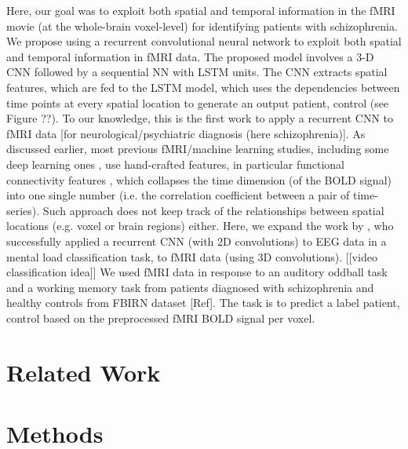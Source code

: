 \documentclass{article} %
\begin{document}
Here, our goal was to exploit both spatial and temporal information in the fMRI movie (at the whole-brain voxel-level) for identifying patients with schizophrenia. We propose using a recurrent convolutional neural network to exploit both spatial and temporal information in fMRI data. The proposed model involves a 3-D CNN followed by a sequential NN with LSTM units. The CNN extracts spatial features, which are fed to the LSTM model, which uses the dependencies between time points at every spatial location to generate an output {patient, control} (see Figure ??). To our knowledge, this is the first work to apply a recurrent CNN to fMRI data [for neurological/psychiatric diagnosis (here schizophrenia)]. As discussed earlier, most previous fMRI/machine learning studies, including some deep learning ones \citep{Kim2016}, use hand-crafted features, in particular functional connectivity features \citep{Gheiratmand2017}, which collapses the time dimension (of the BOLD signal) into one single number (i.e. the correlation coefficient between a pair of time-series). Such approach does not keep track of the relationships between spatial locations (e.g. voxel or brain regions) either. Here, we expand the work by \citet{Bashivan2015}, who successfully applied a recurrent CNN (with 2D convolutions) to EEG data in a mental load classification task, to fMRI data (using 3D convolutions). [[video classification idea]] We used fMRI data in response to an auditory oddball task and a working memory task from patients diagnosed with schizophrenia and healthy controls from FBIRN dataset [Ref]. The task is to predict a label {patient, control} based on the preprocessed fMRI BOLD signal per voxel. 

   


\section{Related Work}


\section{Methods}
\end{document}
